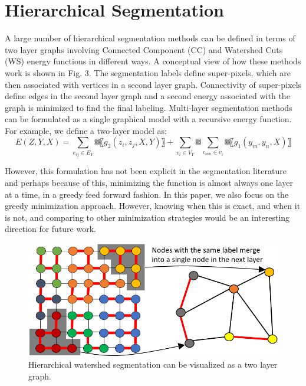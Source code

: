 \documentclass[letterpaper,twocolumn,fleqn]{article}
\begin{document}
\section{Hierarchical Segmentation}

A large number of hierarchical segmentation methods can be defined in terms of two layer graphs involving Connected Component (CC) and Watershed Cuts (WS) energy functions in different ways. A conceptual view of how these methods work is shown in Fig. 3. The segmentation labels define super-pixels, which are then associated with vertices in a second layer graph. Connectivity of super-pixels define edges in the second layer graph and a second energy associated with the graph is minimized to find the final labeling. Multi-layer  segmentation methods can be formulated as a single graphical model with a recursive energy function. For example, we define a two-layer model as: 
\begin{equation}
    E(Z,Y,X)=\sum_{e_{ij}\in E_Y}▒〖g_2 (z_i,z_j,X,Y) 〗+\sum_{v_i\in V_Y}▒\sum_{e_{mn}\in v_i}▒〖g_1 (y_m,y_n,X) 〗
    \label{Eq:recurse}
\end{equation}

However, this formulation has not been explicit in the segmentation literature and perhaps because of this, minimizing the function is almost always one layer at a time, in a greedy feed forward fashion. In this paper, we also focus on the greedy minimization approach. However, knowing when this is exact, and when it is not, and comparing to other minimization strategies \cite{corso} would be an interesting direction for future work. 

\begin{figure}[h]
    \centering
    \includegraphics[height = 0.163\textheight]{Two_Hierarchy.png}
    \caption{Hierarchical watershed segmentation can be visualized as a two layer graph.}
    \label{fig:inferning_threshold}
\end{figure}
\end{document}
